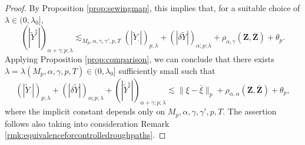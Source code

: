 \documentclass[11pt,a4paper]{article}
\theoremstyle{plain}
\begin{document}
\begin{proof}
By Proposition \ref{prop:sewingmap}, this implies that, for a suitable choice of $\lambda \in (0,\lambda_0]$, \begin{equation*}
    (|\tilde{Y}^\natural|)_{\alpha+\gamma;p;\lambda} \lesssim_{M_p,\alpha,\gamma,\gamma',p,T} (|\tilde{Y}_\cdot|)_{p;\lambda} + (|\delta \tilde{Y}|)_{\alpha;p;\lambda} + \rho_{\alpha,\gamma}(\mathbf{Z},\bar{\mathbf{Z}}) + \theta_p.
\end{equation*}
Applying Proposition \ref{prop:comparison}, we can conclude that there exists $\lambda=\lambda(M_p,\alpha,\gamma,p,T) \in (0,\lambda_0]$ sufficiently small such that  \begin{equation*}
        (|\tilde{Y}_\cdot|)_{p;\lambda} + (|\delta\tilde{Y}|)_{\alpha;p;\lambda} + (|\tilde{Y}^\natural|)_{\alpha+\gamma;p;\lambda} \lesssim \|\xi - \bar{\xi}\|_p + \rho_{\alpha,\alpha}(\mathbf{Z},\bar{\mathbf{Z}}) + \theta_p,
    \end{equation*} where the implicit constant depends only on $M_p,\alpha,\gamma,\gamma',p,T$. The assertion follows also taking into consideration Remark \ref{rmk:equivalenceforcontrolledroughpaths}.
\end{proof}
\end{document}
